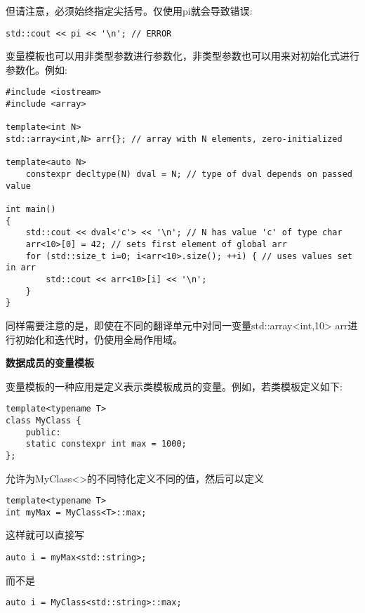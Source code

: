 但请注意，必须始终指定尖括号。仅使用pi就会导致错误:

\begin{lstlisting}[style=styleCXX]
std::cout << pi << '\n'; // ERROR
\end{lstlisting}

变量模板也可以用非类型参数进行参数化，非类型参数也可以用来对初始化式进行参数化。例如:

\begin{lstlisting}[style=styleCXX]
#include <iostream>
#include <array>

template<int N>
std::array<int,N> arr{}; // array with N elements, zero-initialized

template<auto N>
	constexpr decltype(N) dval = N; // type of dval depends on passed value

int main()
{
	std::cout << dval<'c'> << '\n'; // N has value 'c' of type char
	arr<10>[0] = 42; // sets first element of global arr
	for (std::size_t i=0; i<arr<10>.size(); ++i) { // uses values set in arr
		std::cout << arr<10>[i] << '\n';
	}
}
\end{lstlisting}

同样需要注意的是，即使在不同的翻译单元中对同一变量std::array<int,10> arr进行初始化和迭代时，仍使用全局作用域。

\noindent
\textbf{数据成员的变量模板}

变量模板的一种应用是定义表示类模板成员的变量。例如，若类模板定义如下:

\begin{lstlisting}[style=styleCXX]
template<typename T>
class MyClass {
	public:
	static constexpr int max = 1000;
};
\end{lstlisting}

允许为MyClass<>的不同特化定义不同的值，然后可以定义

\begin{lstlisting}[style=styleCXX]
template<typename T>
int myMax = MyClass<T>::max;
\end{lstlisting}

这样就可以直接写

\begin{lstlisting}[style=styleCXX]
auto i = myMax<std::string>;
\end{lstlisting}

而不是

\begin{lstlisting}[style=styleCXX]
auto i = MyClass<std::string>::max;
\end{lstlisting}


